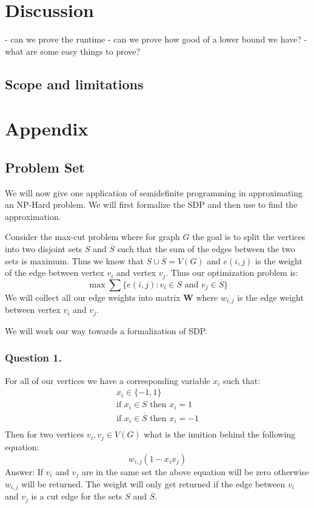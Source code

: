 \documentclass{article}
\begin{document}
\section{Discussion}


- can we prove the runtime
- can we prove how good of a lower bound we have?
- what are some easy things to prove?

\subsection{Scope and limitations}

\section{Appendix}
\newpage
\subsection{Problem Set}
We will now give one application of semidefinite programming in approximating an NP-Hard problem.
We will first formalize the SDP and then use to find the approximation.

Consider the max-cut problem where for graph \( G \) the goal is to split the vertices into two disjoint sets \( S \) and \( \overline{S} \) such that the sum of the edges between the two sets is maximum.
Thus we know that \( S \cup \overline{S} = V(G) \) and \( e(i, j) \) is the weight of the edge between vertex \( v_i \) and vertex \( v_j \).
Thus our optimization problem is:
\[
  \max \sum \{ e(i, j): v_i \in S \text{ and } v_j \in \overline{S} \}
\]
We will collect all our edge weights into matrix \( \mathbf{W} \) where \( w_{i, j} \) is the edge weight between vertex \( v_i \) and \( v_j \).

We will work our way towards a formalization of SDP.
\subsubsection{Question 1.}
For all of our vertices we have a corresponding variable \( x_i \) such that:
\begin{gather*}
x_i \in \{ -1, 1 \} \\
\text{if } x_i \in S \text{ then } x_i = 1 \\
\text{if } x_i \in \overline{S} \text{ then } x_i = -1 \\
\end{gather*}
Then for two vertices \( v_i, v_j \in V(G) \) what is the inuition behind the following equation:
\[
w_{i, j}(1 - x_i x_j)
\]
Answer: If \( v_i \) and \( v_j \) are in the same set the above equation will be zero otherwise \( w_{i, j} \) will be returned. The weight will only get returned if the edge between \( v_i \) and \( v_j \) is a cut edge for the sets \( S \) and \( \overline{S} \).
\end{document}
